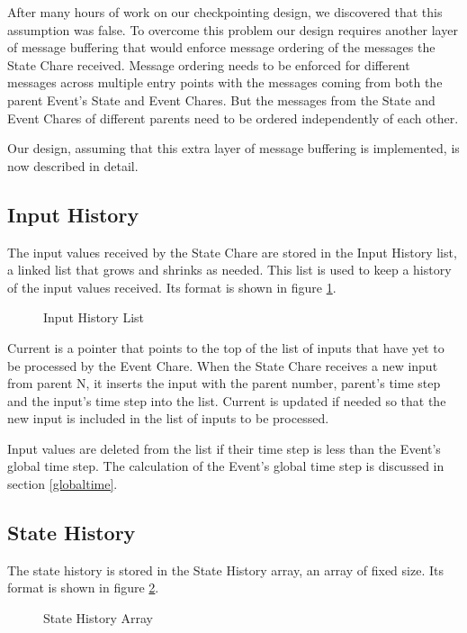 After many hours of work on our checkpointing design, we discovered
that this assumption was false.  To overcome this problem our design
requires another layer of message buffering that would enforce message
ordering of the messages the State Chare received.  Message ordering
needs to be enforced for different messages across multiple entry
points with the messages coming from both the parent Event's State and
Event Chares.  But the messages from the State and Event Chares of
different parents need to be ordered independently of each other.

Our design, assuming that this extra layer of message buffering is
implemented, is now described in detail.

\subsection{Input History}

The input values received by the State Chare are stored in the Input
History list, a linked list that grows and shrinks as needed.  This
list is used to keep a history of the input values received.  Its
format is shown in figure \ref{figinhis}.

\begin{figure}
\label{figinhis}
\centerline{}
\caption{Input History List}
\end{figure}

Current is a pointer that points to the top of the list of inputs that
have yet to be processed by the Event Chare.  When the State Chare
receives a new input from parent N, it inserts the input with the
parent number, parent's time step and the input's time step into the
list.  Current is updated if needed so that the new input is included
in the list of inputs to be processed.

Input values are deleted from the list if their time step is less than
the Event's global time step.  The calculation of the Event's global
time step is discussed in section \ref{globaltime}.

\subsection{State History}

The state history is stored in the State History array, an array of
fixed size.  Its format is shown in figure \ref{figstatehis}.

\begin{figure}
\label{figstatehis}
\centerline{}
\caption{State History Array}
\end{figure}

